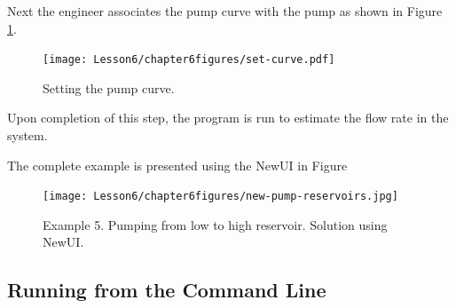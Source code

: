 Next the engineer associates the pump curve with the pump as shown in Figure \ref{fig:set-curve}.
\begin{figure}[h!] %
   \centering
   \texttt{[image: Lesson6/chapter6figures/set-curve.pdf]} 
   \caption{Setting the pump curve.}
   \label{fig:set-curve}
\end{figure}

Upon completion of this step, the program is run to estimate the flow rate in the system.

The complete example is presented using the NewUI in Figure 

\begin{figure}[h!] %
   \centering
   \texttt{[image: Lesson6/chapter6figures/new-pump-reservoirs.jpg]} 
   \caption{Example 5.  Pumping from low to high reservoir.  Solution using NewUI.}
   \label{fig:new-pump-reservoirs}
\end{figure}

\clearpage


\subsection{Running from the Command Line}


